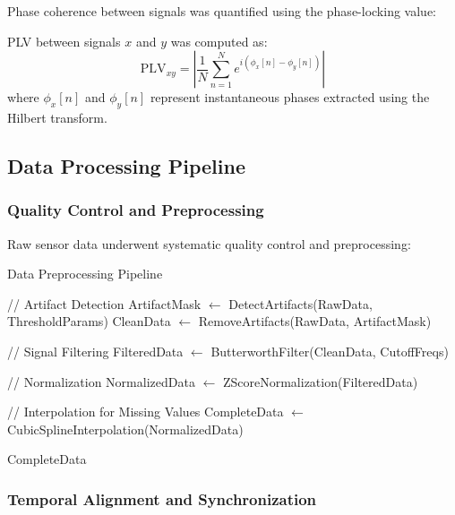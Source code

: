 Phase coherence between signals was quantified using the phase-locking value:

\begin{definition}
PLV between signals $x$ and $y$ was computed as:
\begin{equation}
\text{PLV}_{xy} = \left| \frac{1}{N} \sum_{n=1}^{N} e^{i(\phi_x[n] - \phi_y[n])} \right|
\end{equation}
where $\phi_x[n]$ and $\phi_y[n]$ represent instantaneous phases extracted using the Hilbert transform.
\end{definition}

\subsection{Data Processing Pipeline}

\subsubsection{Quality Control and Preprocessing}

Raw sensor data underwent systematic quality control and preprocessing:

\begin{algorithm}
\caption{Data Preprocessing Pipeline}
\begin{algorithmic}
    \State // Artifact Detection
    \State ArtifactMask $\leftarrow$ DetectArtifacts(RawData, ThresholdParams)
    \State CleanData $\leftarrow$ RemoveArtifacts(RawData, ArtifactMask)
    
    \State // Signal Filtering
    \State FilteredData $\leftarrow$ ButterworthFilter(CleanData, CutoffFreqs)
    
    \State // Normalization
    \State NormalizedData $\leftarrow$ ZScoreNormalization(FilteredData)
    
    \State // Interpolation for Missing Values
    \State CompleteData $\leftarrow$ CubicSplineInterpolation(NormalizedData)
    
    \State \Return CompleteData
\EndProcedure
\end{algorithmic}
\end{algorithm}

\subsubsection{Temporal Alignment and Synchronization}

